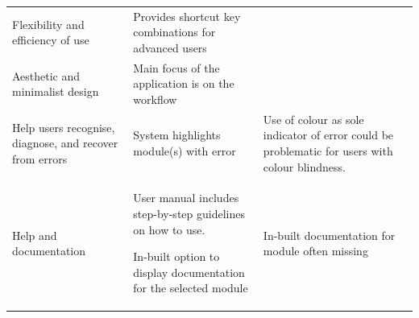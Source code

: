{\begin{longtable}[c]{@{}lll@{}}
\begin{minipage}[t]{0.30\columnwidth}
{Flexibility and efficiency of use}
\strut\end{minipage} &
\begin{minipage}[t]{0.30\columnwidth}\raggedright\strut
{Provides shortcut key combinations for advanced users}
\strut\end{minipage} &
\begin{minipage}[t]{0.30\columnwidth}\raggedright\strut
{}
\strut\end{minipage}\tabularnewline
\begin{minipage}[t]{0.30\columnwidth}\raggedright\strut
{Aesthetic and minimalist design}
\strut\end{minipage} &
\begin{minipage}[t]{0.30\columnwidth}\raggedright\strut
{Main focus of the application is on the workflow}
\strut\end{minipage} &
\begin{minipage}[t]{0.30\columnwidth}\raggedright\strut
{}
\strut\end{minipage}\tabularnewline
\begin{minipage}[t]{0.30\columnwidth}\raggedright\strut
{Help users recognise, diagnose, and recover from errors}
\strut\end{minipage} &
\begin{minipage}[t]{0.30\columnwidth}\raggedright\strut
{System highlights module(s) with error}
\strut\end{minipage} &
\begin{minipage}[t]{0.30\columnwidth}\raggedright\strut
{Use of colour as sole indicator of error could be problematic for users
with colour blindness.}
\strut\end{minipage}\tabularnewline
\begin{minipage}[t]{0.30\columnwidth}\raggedright\strut
{Help and documentation}
\strut\end{minipage} &
\begin{minipage}[t]{0.30\columnwidth}\raggedright\strut
{User manual includes step-by-step guidelines on how to use.}


{}

{In-built option to display documentation for the selected module}
\strut\end{minipage} &
\begin{minipage}[t]{0.30\columnwidth}\raggedright\strut
{In-built documentation for module often missing}
\strut\end{minipage}\tabularnewline
\bottomrule
\end{longtable}
}

\closechapterblock
